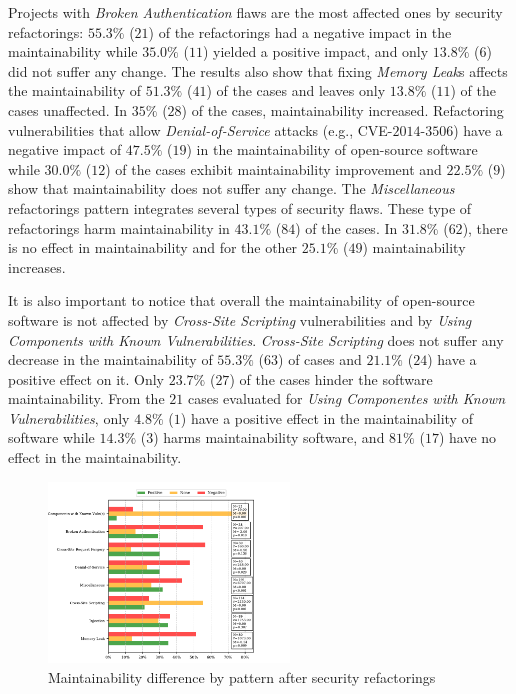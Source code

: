 \documentclass[10pt,conference]{IEEEtran}
\begin{document}
{Projects with \emph{Broken Authentication} flaws are the most affected ones by
security refactorings: $55.3\%$ ($21$) of the refactorings had a negative impact
in the maintainability while $35.0\%$ ($11$) yielded a positive impact, and only
$13.8\%$ ($6$) did not suffer any change. The results also show that fixing
\emph{Memory Leak}s affects the maintainability of $51.3\%$ ($41$) of the cases
and leaves only $13.8\%$ ($11$) of the cases unaffected. In $35\%$ ($28$) of the
cases, maintainability increased. Refactoring vulnerabilities that allow
\emph{Denial-of-Service} attacks (e.g., CVE-$2014$-$3506$) have a negative
impact of $47.5\%$ ($19$) in the maintainability of open-source software while
$30.0\%$ ($12$) of the cases exhibit maintainability improvement and $22.5\%$
($9$) show that maintainability does not suffer any change. The
\emph{Miscellaneous} refactorings pattern integrates several types of security
flaws. These type of refactorings harm maintainability in $43.1\%$ ($84$) of the
cases. In $31.8\%$ ($62$), there is no effect in maintainability and for the
other $25.1\%$ ($49$) maintainability increases.

It is also important to notice that overall the maintainability of open-source
software is not affected by \emph{Cross-Site Scripting} vulnerabilities and by
\emph{Using Components with Known Vulnerabilities}. \emph{Cross-Site Scripting}
does not suffer any decrease in the maintainability of $55.3\%$ ($63$) of cases
and $21.1\%$ ($24$) have a positive effect on it. Only $23.7\%$ ($27$) of the
cases hinder the software maintainability. From the $21$ cases evaluated for
\emph{Using Componentes with Known Vulnerabilities}, only $4.8\%$ ($1$) have a
positive effect in the maintainability of software while $14.3\%$ ($3$) harms
maintainability software, and $81\%$ ($17$) have no effect in the
maintainability.

\begin{figure}[h]
 	\centering
 	\includegraphics[width=0.57\textwidth]{figures/category.pdf}
 	\caption{Maintainability difference by pattern after security refactorings}
	\label{fig:pat}
\end{figure}

}
\end{document}

